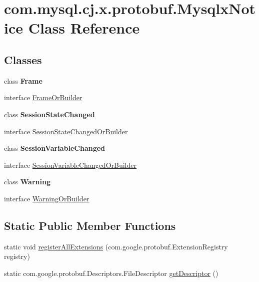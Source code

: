 \hypertarget{classcom_1_1mysql_1_1cj_1_1x_1_1protobuf_1_1_mysqlx_notice}{}\section{com.\+mysql.\+cj.\+x.\+protobuf.\+Mysqlx\+Notice Class Reference}
\label{classcom_1_1mysql_1_1cj_1_1x_1_1protobuf_1_1_mysqlx_notice}
\subsection*{Classes}
\begin{DoxyCompactItemize}
\item 
class {\bfseries Frame}
\item 
interface \mbox{\hyperlink{interfacecom_1_1mysql_1_1cj_1_1x_1_1protobuf_1_1_mysqlx_notice_1_1_frame_or_builder}{Frame\+Or\+Builder}}
\item 
class {\bfseries Session\+State\+Changed}
\item 
interface \mbox{\hyperlink{interfacecom_1_1mysql_1_1cj_1_1x_1_1protobuf_1_1_mysqlx_notice_1_1_session_state_changed_or_builder}{Session\+State\+Changed\+Or\+Builder}}
\item 
class {\bfseries Session\+Variable\+Changed}
\item 
interface \mbox{\hyperlink{interfacecom_1_1mysql_1_1cj_1_1x_1_1protobuf_1_1_mysqlx_notice_1_1_session_variable_changed_or_builder}{Session\+Variable\+Changed\+Or\+Builder}}
\item 
class {\bfseries Warning}
\item 
interface \mbox{\hyperlink{interfacecom_1_1mysql_1_1cj_1_1x_1_1protobuf_1_1_mysqlx_notice_1_1_warning_or_builder}{Warning\+Or\+Builder}}
\end{DoxyCompactItemize}
\subsection*{Static Public Member Functions}
\begin{DoxyCompactItemize}
\item 
static void \mbox{\hyperlink{classcom_1_1mysql_1_1cj_1_1x_1_1protobuf_1_1_mysqlx_notice_ad57d550156408f5afd6f3aaa12d8c0c5}{register\+All\+Extensions}} (com.\+google.\+protobuf.\+Extension\+Registry registry)
\item 
static com.\+google.\+protobuf.\+Descriptors.\+File\+Descriptor \mbox{\hyperlink{classcom_1_1mysql_1_1cj_1_1x_1_1protobuf_1_1_mysqlx_notice_aa99a45f1df9e903f4a4a3c7d9a7ff493}{get\+Descriptor}} ()
\end{DoxyCompactItemize}


